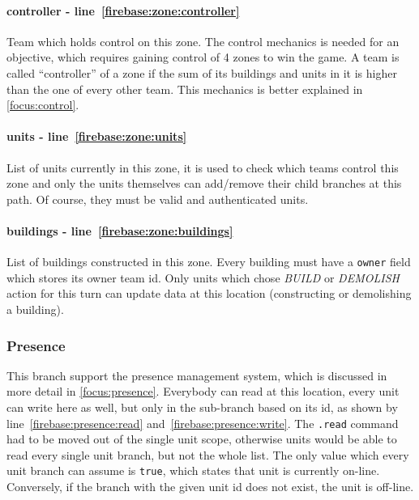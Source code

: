 				\paragraph{controller - line~\ref{firebase:zone:controller}}
				Team which holds control on this zone. The control mechanics is needed for an objective, which requires gaining control of 4 zones to win the game. A team is called “controller” of a zone if the sum of its buildings and units in it is higher than the one of every other team. This mechanics is better explained in \autoref{focus:control}.
				
				\paragraph{units - line~\ref{firebase:zone:units}}
				List of units currently in this zone, it is used to check which teams control this zone and only the units themselves can add/remove their child branches at this path. Of course, they must be valid and authenticated units.
				
				\paragraph{buildings - line~\ref{firebase:zone:buildings}}
				List of buildings constructed in this zone. Every building must have a \lstinline|owner| field which stores its owner team id. Only units which chose \emph{BUILD} or \emph{DEMOLISH} action for this turn can update data at this location (constructing or demolishing a building).
			
			\subsubsection{Presence}\label{model:presence}
		
				
									
				This branch support the presence management system, which is discussed in more detail in \autoref{focus:presence}.
				Everybody can read at this location, every unit can write here as well, but only in the sub-branch based on its id, as shown by line~\ref{firebase:presence:read} and~\ref{firebase:presence:write}.
				The \lstinline|.read| command had to be moved out of the single unit scope, otherwise units would be able to read every single unit branch, but not the whole list.
				The only value which every unit branch can assume is \lstinline|true|, which states that unit is currently on-line. Conversely, if the branch with the given unit id does not exist, the unit is off-line.
			
